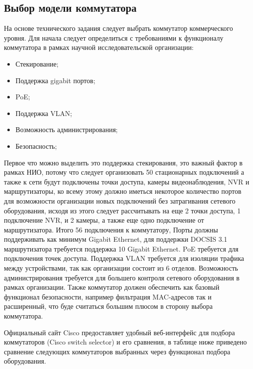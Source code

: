 \subsection{Выбор модели коммутатора}

На основе технического задания следует выбрать коммутатор коммерческого уровня. 
Для начала следует определиться с требованиями к функционалу коммутатора 
в рамках научной исследовательской организации:

\begin{itemize}
    \item Стекирование;
    \item Поддержка gigabit портов;
    \item PoE;    
    \item Поддержка VLAN;    
    \item Возможность администрирования;    
    \item Безопасность;
\end{itemize}

Первое что можно выделить это поддержка стекирования, это важный фактор в рамках НИО, потому что следует организовать 50 стационарных подключений
а также к сети будут подключены точки доступа, камеры видеонаблюдения, NVR и маршрутизаторы, ко всему этому должно иметься некоторое количество портов для возможности
организации новых подключений без затрагивания сетевого оборудования, исходя из этого следует рассчитывать на еще 2 точки доступа, 1 подключение NVR, и 2 камеры, 
а также еще одно подключение от маршрутизатора. Итого 56 подключения к коммутатору,
Порты должны поддерживать как минимум Gigabit Ethernet, для поддержки DOCSIS 3.1 маршрутизатора требуется поддержка 10 Gigabit Ethernet. PoE требуется для подключения точек доступа. 
Поддержка VLAN требуется для изоляции трафика между устройствами, так как организации состоит из 6 отделов.
Возможность администрирования требуется для большего контроля сетевого оборудования в рамках организации.
Также коммутатор должен обеспечить как базовый функционал безопасности, например фильтрация MAC-адресов так и расширенный, что буде считаться большим плюсом в сторону
выбора коммутатора.

Официальный сайт Cisco предоставляет удобный веб-интерфейс для подбора коммутаторов (Cisco switch selector) и его сравнения, в таблице ниже приведено сравнение следующих коммутаторов 
выбранных через функционал подбора оборудования.

